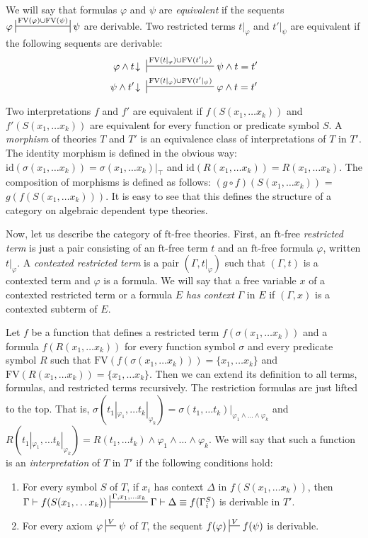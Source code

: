 \documentclass[reqno]{amsart}
\theoremstyle{definition}
\theoremstyle{remark}
\newcommand{\fs}[1]{\mathrm{#1}}
\newcommand{\FV}{\fs{FV}}
\newcommand{\ft}{\fs{ft}}
\newcommand{\id}{\fs{id}}
\numberwithin{figure}{section}
\begin{document}
We will say that formulas $\varphi$ and $\psi$ are \emph{equivalent} if the sequents $\varphi \ssststile{}{\FV(\varphi) \cup \FV(\psi)} \psi$ are derivable.
Two restricted terms $t|_\varphi$ and $t'|_\psi$ are equivalent if the following sequents are derivable:
\begin{align*}
\varphi \land t\!\downarrow\ & \sststile{}{\FV(t|_\varphi) \cup \FV(t'|_\psi)} \psi \land t = t' \\
\psi \land t'\!\downarrow\ & \sststile{}{\FV(t|_\varphi) \cup \FV(t'|_\psi)} \varphi \land t = t'
\end{align*}

Two interpretations $f$ and $f'$ are equivalent if $f(S(x_1, \ldots x_k))$ and $f'(S(x_1, \ldots x_k))$ are equivalent for every function or predicate symbol $S$.
A \emph{morphism} of theories $T$ and $T'$ is an equivalence class of interpretations of $T$ in $T'$.
The identity morphism is defined in the obvious way: $\id(\sigma(x_1, \ldots x_k)) = \sigma(x_1, \ldots x_k)|_\top$ and $\id(R(x_1, \ldots x_k)) = R(x_1, \ldots x_k)$.
The composition of morphisms is defined as follows: $(g \circ f)(S(x_1, \ldots x_k))$ = $g(f(S(x_1, \ldots x_k)))$.
It is easy to see that this defines the structure of a category on algebraic dependent type theories.

Now, let us describe the category of $\ft$-free theories.
First, an $\ft$-free \emph{restricted term} is just a pair consisting of an $\ft$-free term $t$ and an $\ft$-free formula $\varphi$, written $t|_\varphi$.
A \emph{contexted restricted term} is a pair $(\Gamma,t|_\varphi)$ such that $(\Gamma,t)$ is a contexted term and $\varphi$ is a formula.
We will say that a free variable $x$ of a contexted restricted term or a formula $E$ \emph{has context} $\Gamma$ in $E$ if $(\Gamma,x)$ is a contexted subterm of $E$.

Let $f$ be a function that defines a restricted term $f(\sigma(x_1, \ldots x_k))$ and a formula $f(R(x_1, \ldots x_k))$ for every function symbol $\sigma$ and every predicate symbol $R$ such that $\FV(f(\sigma(x_1, \ldots x_k))) = \{ x_1, \ldots x_k \}$ and $\FV(R(x_1, \ldots x_k)) = \{ x_1, \ldots x_k \}$.
Then we can extend its definition to all terms, formulas, and restricted terms recursively.
The restriction formulas are just lifted to the top.
That is, $\sigma(t_1|_{\varphi_1}, \ldots t_k|_{\varphi_k}) = \sigma(t_1, \ldots t_k)|_{\varphi_1 \land \ldots \land \varphi_k}$ and $R(t_1|_{\varphi_1}, \ldots t_k|_{\varphi_k}) = R(t_1, \ldots t_k) \land \varphi_1 \land \ldots \land \varphi_k$.
We will say that such a function is an \emph{interpretation} of $T$ in $T'$ if the following conditions hold:
\begin{enumerate}
\item \label{it:interp-symb} For every symbol $S$ of $T$, if $x_i$ has context $\Delta$ in $f(S(x_1, \ldots x_k))$, then $\Gamma \vdash f(S(x_1, \ldots x_k)) \sststile{}{\Gamma, x_1, \ldots x_k} \Gamma \vdash \Delta \equiv f(\Gamma^S_i)$ is derivable in $T'$.
\item \label{it:interp-axiom} For every axiom $\varphi \sststile{}{V} \psi$ of $T$, the sequent $f(\varphi) \sststile{}{V} f(\psi)$ is derivable.
\end{enumerate}
\end{document}

